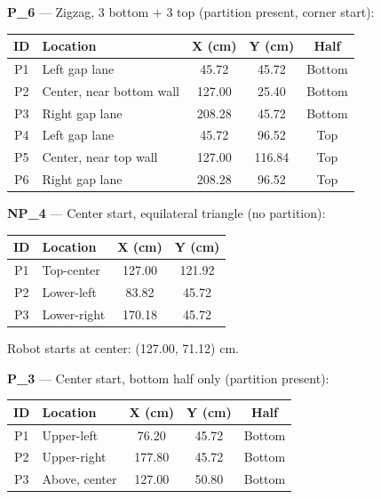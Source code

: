 \documentclass[a4]{article}
\begin{document}
\textbf{P\_6} --- Zigzag, 3 bottom + 3 top (partition present, corner start):

\begin{table}[H]
\centering
\begin{tabular}{clccc}
\toprule
\textbf{ID} & \textbf{Location} & \textbf{X (cm)} & \textbf{Y (cm)} & \textbf{Half} \\
\midrule
P1 & Left gap lane & 45.72 & 45.72 & Bottom \\
P2 & Center, near bottom wall & 127.00 & 25.40 & Bottom \\
P3 & Right gap lane & 208.28 & 45.72 & Bottom \\
P4 & Left gap lane & 45.72 & 96.52 & Top \\
P5 & Center, near top wall & 127.00 & 116.84 & Top \\
P6 & Right gap lane & 208.28 & 96.52 & Top \\
\bottomrule
\end{tabular}
\end{table}

\textbf{NP\_4} --- Center start, equilateral triangle (no partition):

\begin{table}[H]
\centering
\begin{tabular}{clcc}
\toprule
\textbf{ID} & \textbf{Location} & \textbf{X (cm)} & \textbf{Y (cm)} \\
\midrule
P1 & Top-center & 127.00 & 121.92 \\
P2 & Lower-left & 83.82 & 45.72 \\
P3 & Lower-right & 170.18 & 45.72 \\
\bottomrule
\end{tabular}
\end{table}

Robot starts at center: (127.00, 71.12) cm.

\textbf{P\_3} --- Center start, bottom half only (partition present):

\begin{table}[H]
\centering
\begin{tabular}{clccc}
\toprule
\textbf{ID} & \textbf{Location} & \textbf{X (cm)} & \textbf{Y (cm)} & \textbf{Half} \\
\midrule
P1 & Upper-left & 76.20 & 45.72 & Bottom \\
P2 & Upper-right & 177.80 & 45.72 & Bottom \\
P3 & Above, center & 127.00 & 50.80 & Bottom \\
\bottomrule
\end{tabular}
\end{table}
\end{document}
